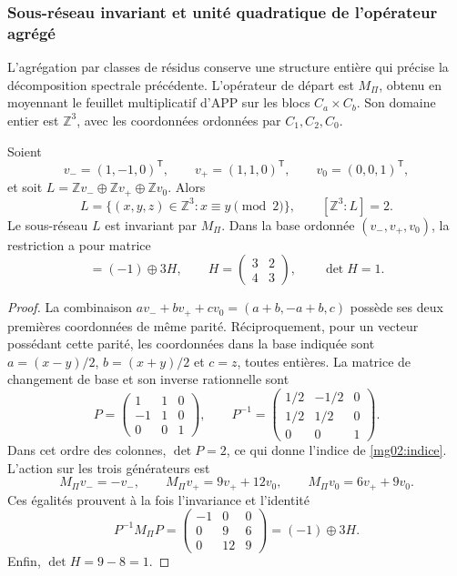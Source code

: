 \subsubsection{Sous-réseau invariant et unité quadratique de l'opérateur agrégé}
\label{mg02:subreticula}

L'agrégation par classes de résidus conserve une structure entière qui
précise la décomposition spectrale précédente. L'opérateur de départ est
\(M_\Pi\), obtenu en moyennant le feuillet multiplicatif d'APP sur
les blocs \(C_a\times C_b\). Son domaine entier est \(\mathbb Z^3\),
avec les coordonnées ordonnées par \(C_1,C_2,C_0\).

\begin{proposition}
Soient
\[
 v_-=(1,-1,0)^{\mathsf T},\qquad
 v_+=(1,1,0)^{\mathsf T},\qquad v_0=(0,0,1)^{\mathsf T},
\]
et soit \(L=\mathbb Zv_-\oplus\mathbb Zv_+\oplus\mathbb Zv_0\).
Alors
\begin{equation}
 L=\{(x,y,z)\in\mathbb Z^3:x\equiv y\pmod2\},
 \qquad [\mathbb Z^3:L]=2.
 \label{mg02:indice}
\end{equation}
Le sous-réseau \(L\) est invariant par \(M_\Pi\). Dans la base
ordonnée \((v_-,v_+,v_0)\), la restriction a pour matrice
\begin{equation}
 [M_\Pi|_L]=(-1)\oplus3H,\qquad
 H=\begin{pmatrix}3&2\\4&3\end{pmatrix},\qquad \det H=1.
 \label{mg02:restriccion}
\end{equation}
\end{proposition}

\begin{proof}
La combinaison \(av_-+bv_++cv_0=(a+b,-a+b,c)\) possède ses deux
premières coordonnées de même parité. Réciproquement, pour un vecteur
possédant cette parité, les coordonnées dans la base indiquée sont
\(a=(x-y)/2\), \(b=(x+y)/2\) et \(c=z\), toutes entières. La matrice
de changement de base et son inverse rationnelle sont
\[
 P=\begin{pmatrix}1&1&0\\-1&1&0\\0&0&1\end{pmatrix},\qquad
 P^{-1}=\begin{pmatrix}1/2&-1/2&0\\1/2&1/2&0\\0&0&1\end{pmatrix}.
\]
Dans cet ordre des colonnes, \(\det P=2\), ce qui donne l'indice de
\eqref{mg02:indice}. L'action sur les trois générateurs est
\[
 M_\Pi v_-=-v_-,\qquad
 M_\Pi v_+=9v_++12v_0,\qquad
 M_\Pi v_0=6v_++9v_0.
\]
Ces égalités prouvent à la fois l'invariance et l'identité
\[
 P^{-1}M_\Pi P=
 \begin{pmatrix}-1&0&0\\0&9&6\\0&12&9\end{pmatrix}
 =(-1)\oplus3H.
\]
Enfin, \(\det H=9-8=1\).
\end{proof}

